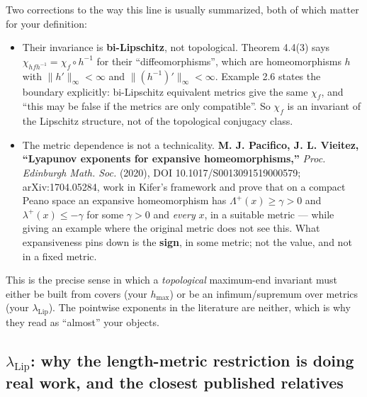\documentclass[
]{article}
\providecommand{\tightlist}{%
  \setlength{\itemsep}{0pt}\setlength{\parskip}{0pt}}
\begin{document}
Two corrections to the way this line is usually summarized, both of
which matter for your definition:

\begin{itemize}
\tightlist
\item
  Their invariance is \textbf{bi-Lipschitz}, not topological. Theorem
  4.4(3) says \(\chi_{hfh^{-1}}=\chi_f\circ h^{-1}\) for their
  ``diffeomorphisms'', which are homeomorphisms \(h\) with
  \(\|h'\|_\infty<\infty\) and \(\|(h^{-1})'\|_\infty<\infty\). Example
  2.6 states the boundary explicitly: bi-Lipschitz equivalent metrics
  give the same \(\chi_f\), and ``this may be false if the metrics are
  only compatible''. So \(\chi_f\) is an invariant of the Lipschitz
  structure, not of the topological conjugacy class.
\item
  The metric dependence is not a technicality. \textbf{M. J. Pacifico,
  J. L. Vieitez, ``Lyapunov exponents for expansive homeomorphisms,''}
  \emph{Proc. Edinburgh Math. Soc.} (2020), DOI
  10.1017/S0013091519000579; arXiv:1704.05284, work in Kifer's framework
  and prove that on a compact Peano space an expansive homeomorphism has
  \(\Lambda^+(x)\ge\gamma>0\) and \(\lambda^+(x)\le-\gamma\) for some
  \(\gamma>0\) and \emph{every} \(x\), in a suitable metric --- while
  giving an example where the original metric does not see this. What
  expansiveness pins down is the \textbf{sign}, in some metric; not the
  value, and not in a fixed metric.
\end{itemize}

This is the precise sense in which a \emph{topological} maximum-end
invariant must either be built from covers (your \(h_{\max}\)) or be an
infimum/supremum over metrics (your \(\lambda_{\mathrm{Lip}}\)). The
pointwise exponents in the literature are neither, which is why they
read as ``almost'' your objects.

\subsection{\texorpdfstring{\(\lambda_{\mathrm{Lip}}\): why the
length-metric restriction is doing real work, and the closest published
relatives}{\textbackslash lambda\_\{\textbackslash mathrm\{Lip\}\}: why the length-metric restriction is doing real work, and the closest published relatives}}\label{lambda_mathrmlip-why-the-length-metric-restriction-is-doing-real-work-and-the-closest-published-relatives}
\end{document}
